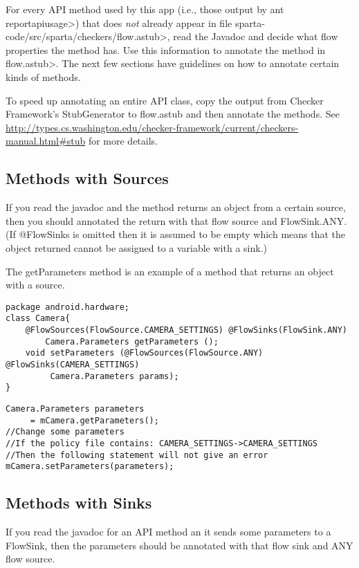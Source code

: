 For every API method used by this app (i.e., those output by \<ant
reportapiusage>) that does \emph{not} already appear in file
\<sparta-code/src/sparta/checkers/flow.astub>, read the Javadoc and decide what flow properties the method
has.  Use this information to annotate the method in \<flow.astub>.  The next few sections have guidelines on
how to annotate certain kinds of methods. 

To speed up annotating an entire API class, copy the output from Checker Framework's StubGenerator to 
flow.astub and then annotate the methods.  See \url{http://types.cs.washington.edu/checker-framework/current/checkers-manual.html#stub} for more details. 

\subsection{Methods with Sources}
If you read the javadoc and the method returns an object from a certain source, then you should annotated 
the return with that flow source and FlowSink.ANY. (If  @FlowSinks is omitted then it is assumed to be empty
 which means that the object returned cannot be assigned to a variable with a sink.)

The getParameters method is an example of a method that returns an object with a source.
\begin{Verbatim}
package android.hardware;
class Camera{
    @FlowSources(FlowSource.CAMERA_SETTINGS) @FlowSinks(FlowSink.ANY)
        Camera.Parameters getParameters ();
    void setParameters (@FlowSources(FlowSource.ANY) @FlowSinks(CAMERA_SETTINGS) 
         Camera.Parameters params);
}
\end{Verbatim}

\begin{Verbatim}
Camera.Parameters parameters
     = mCamera.getParameters();
//Change some parameters
//If the policy file contains: CAMERA_SETTINGS->CAMERA_SETTINGS
//Then the following statement will not give an error
mCamera.setParameters(parameters);
\end{Verbatim}



\subsection{Methods with Sinks}
If you read the javadoc for an API method an it sends some parameters to a FlowSink, then the parameters
should be annotated with that flow sink and ANY flow source.  

